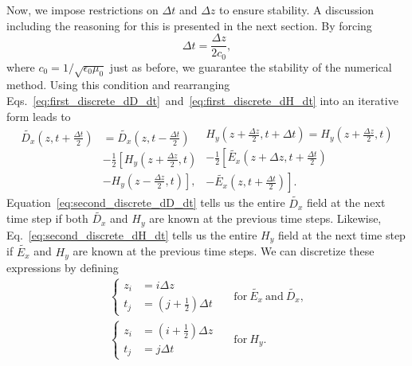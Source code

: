 \documentclass[12pt,twocolumn]{article}
\begin{document}
Now, we impose restrictions on $\Delta t$ and $\Delta z$ to ensure stability. A discussion including the reasoning for this is presented in the next section. By forcing
\begin{equation}
\Delta t=\frac{\Delta z}{2c_0},
\end{equation}
 where $c_0=1/\sqrt{\epsilon_0\mu_0}$ just as before, we guarantee the stability of the numerical method. Using this condition and rearranging Eqs.~\ref{eq:first_discrete_dD_dt}~and~\ref{eq:first_discrete_dH_dt} into an iterative form leads to
\begin{subequations}
\begin{equation}
\label{eq:second_discrete_dD_dt}\begin{split}
\tilde{D_x}\left(z,t+\frac{\Delta t}{2}\right)&=\tilde{D_x}\left(z,t-\frac{\Delta t}{2}\right) \\
&   -\frac{1}{2}\left[H_y\left(z+\frac{\Delta z}{2},t\right)\right. \\
&- \left. H_y\left(z-\frac{\Delta z}{2},t\right)\right],
\end{split}
\end{equation}
\begin{equation}
\label{eq:second_discrete_dH_dt}\begin{split}
H_y\left(z+\frac{\Delta z}{2},t+\Delta t\right)=H_y\left(z+\frac{\Delta z}{2},t\right) \\
     -\frac{1}{2}\left[\tilde{E_x}\left(z+\Delta z,t+\frac{\Delta t}{2}\right)\right. \\
\left. -\tilde{E_x}\left(z,t+\frac{\Delta t}{2}\right)\right].
\end{split}
\end{equation}
\end{subequations}
Equation~\ref{eq:second_discrete_dD_dt} tells us the entire $\tilde{D_x}$ field at the next time step if both $\tilde{D_x}$ and $H_y$ are known at the previous time steps. Likewise, Eq.~\ref{eq:second_discrete_dH_dt} tells us the entire $H_y$ field at the next time step if $\tilde{E_x}$ and $H_y$ are known at the previous time steps. We can discretize these expressions by defining
\begin{equation}
\begin{aligned}
\left\{
\begin{split}
z_i&=i\Delta z \\
t_j&=\left(j+\frac{1}{2}\right)\Delta t
\end{split}\right.~~&~\mathrm{for}~\tilde{E_x}~\mathrm{and}~\tilde{D_x}, \\
\left\{
\begin{split}
z_i&=\left(i+\frac{1}{2}\right)\Delta z \\
t_j&=j\Delta t
\end{split}\right.~~&~\mathrm{for}~H_y.
\end{aligned}
\end{equation}
\end{document}
